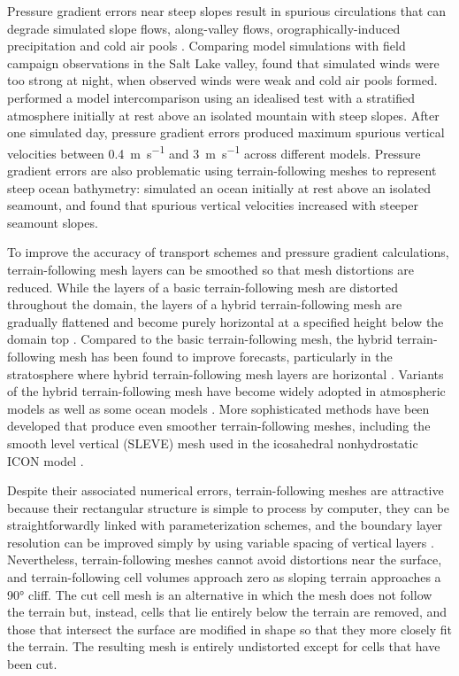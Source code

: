 Pressure gradient errors near steep slopes result in spurious circulations that can degrade simulated slope flows, along-valley flows, orographically-induced precipitation and cold air pools \citep{zaengl2004a}.
Comparing model simulations with field campaign observations in the Salt Lake valley, \citet{fast2003} found that simulated winds were too strong at night, when observed winds were weak and cold air pools formed.
\citet{zaengl2004a} performed a model intercomparison using an idealised test with a stratified atmosphere initially at rest above an isolated mountain with steep slopes.
After one simulated day, pressure gradient errors produced maximum spurious vertical velocities between \SI{0.4}{\meter\per\second} and \SI{3}{\meter\per\second} across different models.
Pressure gradient errors are also problematic using terrain-following meshes to represent steep ocean bathymetry:  
\citet{luo2002} simulated an ocean initially at rest above an isolated seamount, and found that spurious vertical velocities increased with steeper seamount slopes.

To improve the accuracy of transport schemes and pressure gradient calculations, terrain-following mesh layers can be smoothed so that mesh distortions are reduced.
While the layers of a basic terrain-following mesh are distorted throughout the domain, the layers of a hybrid terrain-following mesh are gradually flattened and become purely horizontal at a specified height below the domain top \citep{simmons-burridge1981}.
Compared to the basic terrain-following mesh, the hybrid terrain-following mesh has been found to improve forecasts, particularly in the stratosphere where hybrid terrain-following mesh layers are horizontal \citep{eckermann2014}.
Variants of the hybrid terrain-following mesh have become widely adopted in atmospheric models \citep{davies2005,donner2011} as well as some ocean models \citep{burchard-petersen1997,halliwell2004}.
More sophisticated methods have been developed that produce even smoother terrain-following meshes, including the smooth level vertical (SLEVE) mesh \citep{schaer2002,leuenberger2010} used in the icosahedral nonhydrostatic ICON model \citep{zaengl2015}.

Despite their associated numerical errors, terrain-following meshes are attractive because their rectangular structure is simple to process by computer, they can be straightforwardly linked with parameterization schemes, and the boundary layer resolution can be improved simply by using variable spacing of vertical layers \citep{schaer2002}.
Nevertheless, terrain-following meshes cannot avoid distortions near the surface, and terrain-following cell volumes approach zero as sloping terrain approaches a \ang{90} cliff.
The cut cell mesh is an alternative in which the mesh does not follow the terrain but, instead, cells that lie entirely below the terrain are removed, and those that intersect the surface are modified in shape so that they more closely fit the terrain.
The resulting mesh is entirely undistorted except for cells that have been cut.

